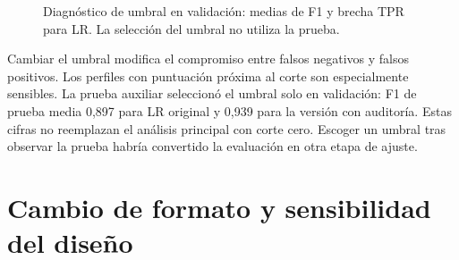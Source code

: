 \documentclass[11pt,a4paper,oneside]{report}
\begin{document}
\begin{figure}[htbp]
\caption[Diagnóstico de umbral en validación: medias de F1 y brecha TPR para LR]{Diagnóstico de umbral en validación: medias de F1 y brecha TPR para LR. La selección del umbral no utiliza la prueba.}\label{fig:umbrales}\end{figure}

Cambiar el umbral modifica el compromiso entre falsos negativos y falsos positivos. Los perfiles con puntuación próxima al corte son especialmente sensibles. La prueba auxiliar seleccionó el umbral solo en validación: F1 de prueba media 0,897 para LR original y 0,939 para la versión con auditoría. Estas cifras no reemplazan el análisis principal con corte cero. Escoger un umbral tras observar la prueba habría convertido la evaluación en otra etapa de ajuste.

\section{Cambio de formato y sensibilidad del diseño}
\end{document}
